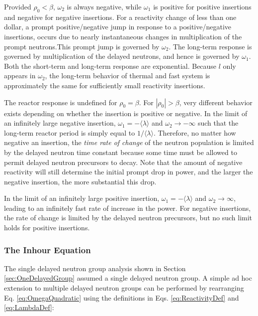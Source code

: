 Provided \(\rho_0<\beta\), \(\omega_2\) is always negative, while \(\omega_1\) is positive for positive insertions and negative for negative insertions. For a reactivity change of less than one dollar, a prompt positive/negative jump in response to a positive/negative insertions, occurs due to nearly instantaneous changes in multiplication of the prompt neutrons.This prompt jump is governed by \(\omega_2\). The long-term response is governed by multiplication of the delayed neutrons, and hence is governed by \(\omega_1\). Both the short-term and long-term response are exponential. Because \(l\) only appears in \(\omega_2\), the long-term behavior of thermal and fast system is approximately the same for sufficiently small reactivity insertions.

The reactor response is undefined for \(\rho_0=\beta\). For \(|\rho_0|>\beta\), very different behavior exists depending on whether the insertion is positive or negative. In the limit of an infinitely large negative insertion, \(\omega_1=-\langle\lambda\rangle\) and \(\omega_2\rightarrow-\infty\) such that the long-term reactor period is simply equal to \(1/\langle\lambda\rangle\). Therefore, no matter how negative an insertion, the {\it time rate of change} of the neutron population is limited by the delayed neutron time constant because some time must be allowed to permit delayed neutron precursors to decay. Note that the amount of negative reactivity will still determine the initial prompt drop in power, and the larger the negative insertion, the more substantial this drop.

In the limit of an infinitely large positive insertion, \(\omega_1=-\langle\lambda\rangle\) and \(\omega_2\rightarrow\infty\), leading to an infinitely fast rate of increase in the power. For negative insertions, the rate of change is limited by the delayed neutron precursors, but no such limit holds for positive insertions.

\subsubsection{The Inhour Equation}
\label{sec:Inhour}

The single delayed neutron group analysis shown in Section \ref{sec:OneDelayedGroup} assumed a single delayed neutron group. A simple ad hoc extension to multiple delayed neutron groups can be performed by rearranging Eq. \eqref{eq:OmegaQuadratic} using the definitions in Eqs. \eqref{eq:ReactivityDef} and \eqref{eq:LambdaDef}:

